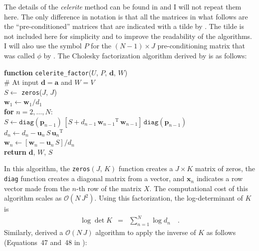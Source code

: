 \documentclass[rnaas]{aastex62}
\newcommand{\T}{\ensuremath{\mathrm{T}}}
\newcommand{\bvec}[1]{{\ensuremath{\boldsymbol{#1}}}}
\begin{document}
The details of the \emph{celerite} method can be found in
\citet{Foreman-Mackey:2017} and I will not repeat them here.
The only difference in notation is that all the matrices in what follows are
the ``pre-conditioned'' matrices that are indicated with a tilde by
\citet{Foreman-Mackey:2017}.
The tilde is not included here for simplicity and to improve the readability
of the algorithms.
I will also use the symbol $P$ for the $(N-1) \times J$ pre-conditioning matrix
that was called $\phi$ by \citet{Foreman-Mackey:2017}.
The Cholesky factorization algorithm derived by \citet[][their
Equation~46]{Foreman-Mackey:2017} is as follows:

\medskip
\begin{minipage}{\linewidth}
\textbf{function} \texttt{celerite\_factor}($U$, $P$, $\bvec{d}$, $W$) \\
\hspace*{2em}\textsf{\# At input $\bvec{d} = \bvec{a}$ and $W = V$} \\
\hspace*{2em}$S \gets$ \texttt{zeros}($J$, $J$) \\
    \hspace*{2em}$\bvec{w}_1 \gets \bvec{w}_1 / d_{1}$ \\
\hspace*{2em}\textbf{for} $n = 2,\ldots,N$:\\
\hspace*{2em}\hspace*{2em}$S \gets \texttt{diag}(\bvec{p}_{n-1})\,[
    S + d_{n-1}\,{\bvec{w}_{n-1}}^\T\,{\bvec{w}_{n-1}}
]\,\texttt{diag}(\bvec{p}_{n-1})$ \\
\hspace*{2em}\hspace*{2em}$d_{n} \gets d_{n} - \bvec{u}_n\,S\,{\bvec{u}_n}^\T$\\
\hspace*{2em}\hspace*{2em}$\bvec{w}_n \gets \left[\bvec{w}_n -
    \bvec{u}_n\,S \right] / d_{n}$\\
    \hspace*{2em}\textbf{return} $\bvec{d}$, $W$, $S$
\end{minipage}
\medskip

\noindent In this algorithm, the \texttt{zeros}$(J,\,K)$ function creates a $J
\times K$ matrix of zeros, the \texttt{diag} function creates a diagonal
matrix from a vector, and $\bvec{x}_n$ indicates a row vector made from the
$n$-th row of the matrix $X$.
The computational cost of this algorithm scales as $\mathcal{O}(N\,J^2)$.
Using this factorization, the log-determinant of $K$ is
\begin{eqnarray}
\log \det K &=& \sum_{n=1}^N \log d_{n} \quad.
\end{eqnarray}
Similarly, \citet{Foreman-Mackey:2017} derived a $\mathcal{O}(N\,J)$ algorithm
to apply the inverse of $K$ as follows (Equations~47 and~48 in
\citealt{Foreman-Mackey:2017}):
\end{document}

